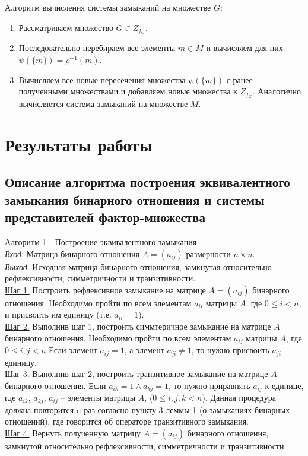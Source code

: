 \documentclass[bachelor, och, labwork]{shiza}
\begin{document}
        Алгоритм вычисления системы замыканий на множестве $G$:
        \begin{enumerate}
            \item Рассматриваем множество $G \in Z_{f_G}$.
            \item Последовательно перебираем все элементы $m \in M$ и вычисляем для них $\psi(\{m\}) = \rho^{-1}(m)$.
            \item Вычисляем все новые пересечения множества $\psi(\{m\})$ с ранее полученными множествами и добавляем новые множества к $Z_{f_G}$. Аналогично вычисляется система замыканий на множестве $M$.
        \end{enumerate}

\section{Результаты работы}
    \subsection{Описание алгоритма построения эквивалентного замыкания бинарного отношения и системы представителей
    фактор-множества}

        \underline{Алгоритм 1 - Построение эквивалентного замыкания}\\
            \textit{Вход}: Матрица бинарного отношения $A = (a_{ij})$ размерности $n \times n$.\\
            \textit{Выход}: Исходная матрица бинарного отношения, замкнутая относительно рефлексивности, симметричности и
            транзитивности.\\
            \underline{Шаг 1.} Построить рефлексивное замыкание на матрице $A = (a_{ij})$ бинарного отношения.
            Необходимо пройти по всем элементам $a_{ii}$ матрицы $A$, где $0 \leq i < n$, и присвоить им единицу (т.е. $a_{ii}=1$).\\
            \underline{Шаг 2.} Выполнив шаг 1, построить симмтеричное замыкание на матрице $A$ бинарного отношения. 
            Необходимо пройти по всем элементам  $a_{ij}$ матрицы $A$, где $0 \leq i,j < n$ Если элемент $a_{ij}=1$,
            а элемент $a_{ji} \neq 1$, то нужно присвоить $a_{ji}$ единицу.\\            
            \underline{Шаг 3.} Выполнив шаг 2, построить транзитивное замыкание на матрице $A$ бинарного отношения.
            Если $a_{ik} = 1 \wedge a_{kj} = 1$, то нужно приравнять $a_{ij}$ к единице, где $a_{ik}$, $a_{kj}$, $a_{ij}$ --
            элементы матрицы $A$, ($0 \leq i,j,k < n$). Данная процедура должна повторится n раз согласно пункту 3 леммы 1 
            (о замыканиях бинарных отношений), где говорится об операторе транзитивного замыкания.\\
            \underline{Шаг 4.} Вернуть полученную матрицу $A = (a_{ij})$ бинарного отношения, замкнутой относительно 
            рефлексивности, симметричности и транзитивности.\\
            
\end{document}
